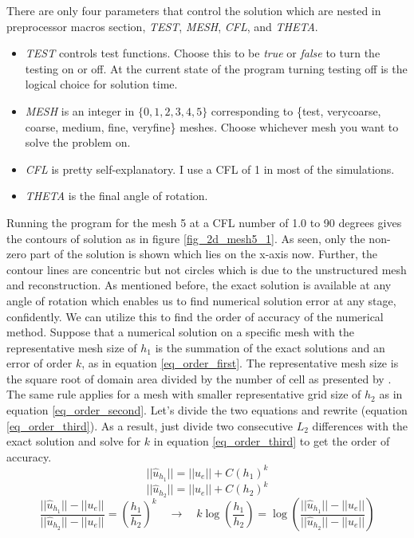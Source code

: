\documentclass{article}
\begin{document}
There are only four parameters that control the solution which are nested in preprocessor macros section, \textit{TEST}, \textit{MESH}, \textit{CFL}, and \textit{THETA}.
\begin{itemize}
\item \textit{TEST} controls test functions. Choose this to be \textit{true} or \textit{false} to turn the testing on or off. At the current state of the program turning testing off is the logical choice for solution time.
\item \textit{MESH} is an integer in $\{0, 1, 2, 3, 4, 5\}$ corresponding to \{test, verycoarse, coarse, medium, fine, veryfine\} meshes. Choose whichever mesh you want to solve the problem on.
\item \textit{CFL} is pretty self-explanatory. I use a CFL of 1 in most of the simulations.
\item \textit{THETA} is the final angle of rotation.
\end{itemize}

Running the program for the mesh 5 at a CFL number of 1.0 to 90 degrees gives the contours of solution as in figure \ref{fig_2d_mesh5_1}. As seen, only the non-zero part of the solution is shown which lies on the x-axis now. Further, the contour lines are concentric but not circles which is due to the unstructured mesh and reconstruction. As mentioned before, the exact solution is available at any angle of rotation which enables us to find numerical solution error at any stage, confidently. We can utilize this to find the order of accuracy of the numerical method. Suppose that a numerical solution on a specific mesh with the representative mesh size of $h_1$ is the summation of the exact solutions and an error of order $k$, as in equation \ref{eq_order_first}. The representative mesh size is the square root of domain area divided by the number of cell as presented by \cite{asme}. The same rule applies for a mesh with smaller representative grid size of $h_2$ as in equation \ref{eq_order_second}. Let's divide the two equations and rewrite (equation \ref{eq_order_third}). As a result, just divide two consecutive $L_2$ differences with the exact solution and solve for $k$ in equation \ref{eq_order_third} to get the order of accuracy.
\begin{equation}
\label{eq_order_first}
||\hat{u}_{h_1}||=||u_e||+C (h_1)^k
\end{equation}
\begin{equation}
\label{eq_order_second}
||\hat{u}_{h_2}||=||u_e||+C\left(h_2\right)^k
\end{equation}
\begin{equation}
\label{eq_order_third}
\dfrac{||\hat{u}_{h_1}||-||u_e||}{||\hat{u}_{h_2}||-||u_e||}=\left(\dfrac{h_1}{h_2}\right)^k \quad\rightarrow\quad k \log \left(\dfrac{h_1}{h_2}\right)=\log \left(\dfrac{||\hat{u}_{h_1}||-||u_e||}{||\hat{u}_{h_2}||-||u_e||}\right)
\end{equation}
\end{document}
